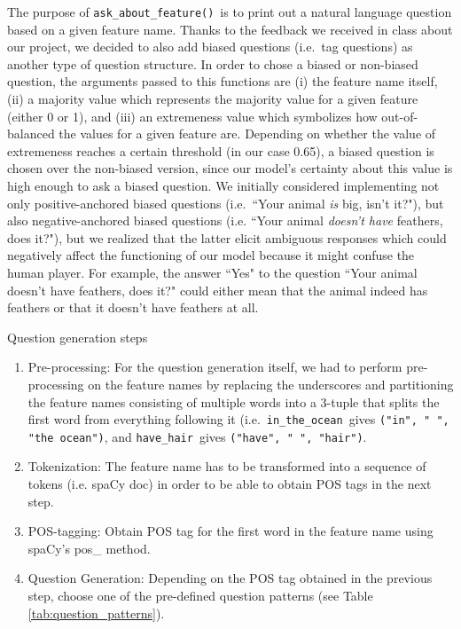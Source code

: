 \documentclass[11pt,a4paper]{article}
\newcommand{\havehair}{\texttt{have\_hair}}
\newcommand{\askaboutfeat}{\texttt{ask\_about\_feature()}}
\newcommand{\intheocean}{\texttt{in\_the\_ocean}}
\begin{document}
{The purpose of \askaboutfeat \ is to print out a natural language question based on a given feature name. Thanks to the feedback we received in class about our project, we decided to also add biased questions (i.e.\ tag questions) as another type of question structure. In order to chose a biased or non-biased question, the arguments passed to this functions are (i) the feature name itself, (ii) a majority value which represents the majority value for a given feature (either 0 or 1), and (iii) an extremeness value which symbolizes how out-of-balanced the values for a given feature are. Depending on whether the value of extremeness reaches a certain threshold (in our case 0.65), a biased question is chosen over the non-biased version, since our model’s certainty about this value is high enough to ask a biased question. We initially considered implementing not only positive-anchored biased questions (i.e.\ 
``Your animal \textit{is} big, isn’t it?"), but also negative-anchored biased questions (i.e. 
``Your animal \textit{doesn't have} feathers, does it?"), but we realized that the latter elicit ambiguous responses which could negatively affect the functioning of our model because it might confuse the human player.
For example, the answer ``Yes" to the question ``Your animal doesn’t have feathers, does it?" could either mean that the animal indeed has feathers or that it doesn’t have feathers at all.

\noindent Question generation steps
\begin{enumerate}
  \item Pre-processing: For the question generation itself, we had to perform pre-processing on the feature names by replacing the underscores and partitioning the feature names consisting of multiple words into a 3-tuple that splits the first word from everything following it (i.e.\ \intheocean\  gives \texttt{("in", " ", "the ocean")}, and \havehair\  gives \texttt{("have", " ", "hair")}.
  \item Tokenization: The feature name has to be transformed into a sequence of tokens (i.e. spaCy doc) in order to be able to obtain POS tags in the next step. 
  \item POS-tagging: Obtain POS tag for the first word in the feature name using spaCy’s pos\_ method.
  \item Question Generation: Depending on the POS tag obtained in the previous step, choose one of the pre-defined question patterns (see Table  \ref{tab:question_patterns}). 
\end{enumerate}

}
\end{document}
